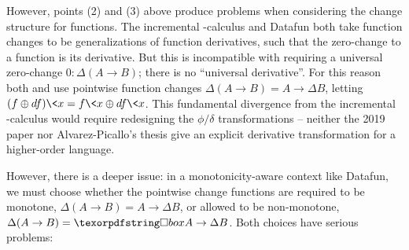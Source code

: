 However, points (2) and (3) above produce problems when considering the change structure for functions.
%
The incremental \fn-calculus and Datafun both take function changes to be generalizations of function derivatives, such that the zero-change to a function is its derivative.
%
But this is incompatible with requiring a universal zero-change $0 : \Delta (A \to B)$; there is no ``universal derivative''.
%
%
For this reason both \citet{DBLP:conf/esop/Alvarez-Picallo19} and \citet{mario-thesis} use pointwise function changes $\Delta(A \to B) = A \to \Delta B$, letting $(f \oplus df)\<x = f\<x \oplus df\<x$.
%
%
This fundamental divergence from the incremental \fn-calculus would require
redesigning the $\phi/\delta$ transformations -- neither the 2019 paper nor
Alvarez-Picallo's thesis give an explicit derivative transformation for a
higher-order language.

\label{pointwise-changes-monotonicity}

However, there is a deeper issue: in a monotonicity-aware context like Datafun, we must choose whether the pointwise change functions are required to be monotone, $\Delta(A \to B) = A \to \Delta B$, or allowed to be non-monotone, $\Delta(A \to B) = \iso A \to \Delta B$.
%
Both choices have serious problems:


